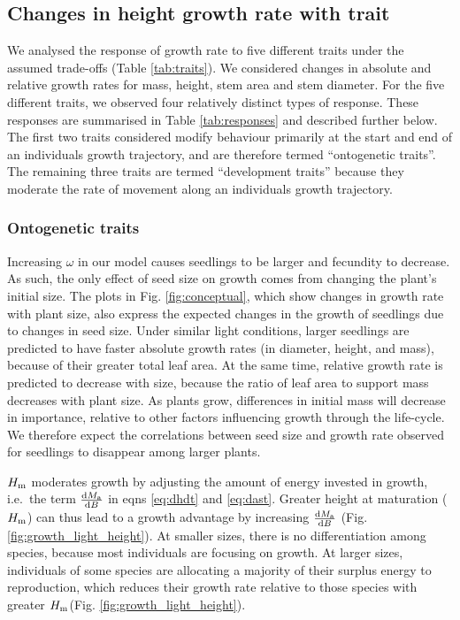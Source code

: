 \documentclass[a4paper,11pt]{article}
\begin{document}
\subsection{Changes in height growth rate with trait}

We analysed the response of growth rate to five different traits under the assumed trade-offs (Table \ref{tab:traits}). We considered changes in absolute and relative growth rates for mass, height, stem area and stem diameter. For the five different traits, we observed four relatively distinct types of response. These responses are summarised in Table \ref{tab:responses} and described further below. The first two traits considered modify behaviour primarily at the start and end of an individuals growth trajectory, and are therefore termed ``ontogenetic traits''. The remaining three traits are termed ``development traits'' because they moderate the rate of movement along an individuals growth trajectory.

\subsubsection{Ontogenetic traits}

Increasing $\omega$ in our model causes seedlings to be larger and fecundity to decrease. As such, the only effect of seed size on growth comes from changing the plant's initial  size. The plots in Fig. \ref{fig:conceptual}, which show changes in growth rate with plant size, also express the expected changes in the growth of seedlings due to changes in seed size. Under similar light conditions, larger seedlings are predicted to have faster absolute growth rates (in diameter, height, and mass), because of their greater total leaf area. At the same time, relative growth rate is predicted to decrease with size, because the ratio of leaf area to support mass decreases with plant size. As plants grow, differences in initial mass will decrease in importance, relative to other factors influencing growth through the life-cycle. We therefore expect the correlations between seed size and growth rate observed for seedlings to disappear among larger plants.

$H_{\rm m}$ moderates growth by adjusting the amount of energy invested in growth, i.e.~the term $\frac{{\rm d}M_{\rm a}}{{\rm d}B}$ in eqns \ref{eq:dhdt} and \ref{eq:dast}. Greater height at maturation ($H_{\rm m}$) can thus lead to a growth advantage by increasing $\frac{{\rm d}M_{\rm a}}{{\rm d}B}$ (Fig. \ref{fig:growth_light_height}). At smaller sizes, there is no differentiation among species, because most individuals are focusing on growth. At larger sizes, individuals of some species are allocating a majority of their surplus energy to reproduction, which reduces their growth rate relative to those species with greater $H_{\rm m}$(Fig. \ref{fig:growth_light_height}).
\end{document}
